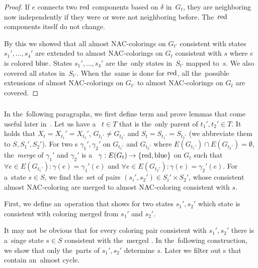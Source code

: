 \begin{proof}
	If \( e \) connects two \( \text{red} \) components based on \( \delta \) in~\( G_t \),
	they are neighboring now independently if they were or were not neighboring before.
	The~\( \text{red} \) components itself do not change.

	By this we showed that all almost NAC-colorings on \( G_{t'} \) consistent with
	states \( s_1', \dots, s_4' \) are extended to almost NAC-colorings on \( G_t \)
	consistent with \( s \) where \( e \) is colored \( \text{blue} \).
	States \( s_1', \dots, s_4' \) are the~only states in~\( S_{t'} \) mapped to~\( s \).
	We also covered all states in~\( S_{t'} \).
	When the~same is done for \( \text{red} \), all the~possible extensions
	of almost NAC-colorings on \( G_{t'} \) to almost NAC-colorings on \( G_t \)
	are covered.
\end{proof}

\subsubsection*{\JoinNode{}}

In the~following paragraphs,
we first define term and prove lemmas
that come useful later in~.
%
Let us have a~\JoinNode{} \( t \in T \) that is
the~only parent of \( t_1', t_2' \in T \).
It holds that \( X_t = X_{t_1}' = X_{t_2}' \),
\( G_{t_1'} \ne G_{t_2'} \)
and \( S_t = S_{t_1'} = S_{t_2'} \)
(we abbreviate them to \( S, S_1', S_2' \)).
%
For two \rbcol{}s \( \gamma_1', \gamma_2' \)
on \( G_{t_1'} \) and \( G_{t_2'} \)
where \( E(G_{t_1'}) \cap E(G_{t_2'}) = \emptyset \),
the~\emph{merge} of \( \gamma_1' \) and \( \gamma_2' \)
is a~\rbcol{} \( \gamma : E(G_t) \to \{ \text{red}, \text{blue} \} \) on \( G_t \)
such that \( \forall e \in E(G_{t_1'}) : \gamma(e) = \gamma_1'(e) \) and
\( \forall e \in E(G_{t_2'}) : \gamma(e) = \gamma_2'(e) \).
%
For a~state \( s \in S \), we find the~set of
pairs \( (s_i', s_2') \in S_i' \times S_2' \),
whose consistent almost NAC-coloring are merged
to almost NAC-coloring consistent with \( s \).

First, we define an~operation that shows for two states \( s_1', s_2' \)
which state is consistent with coloring merged from \( s_1' \) and \( s_2' \).
%
%
It may not be obvious that for every coloring pair consistent with \( s_1', s_2' \)
there is a~singe state \( s \in S \) consistent with the~merged \rbcol{}.
In the~following construction, we show that
only the~parts of \( s_1', s_2' \) determine \( s \).
Later we filter out \rbcol{}s that contain an~almost cycle.


